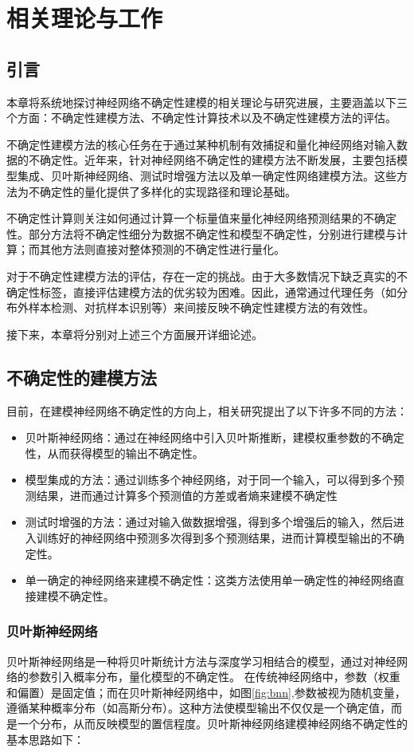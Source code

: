 \chapter{相关理论与工作}
\section{引言}

本章将系统地探讨神经网络不确定性建模的相关理论与研究进展，主要涵盖以下三个方面：不确定性建模方法、不确定性计算技术以及不确定性建模方法的评估。

不确定性建模方法的核心任务在于通过某种机制有效捕捉和量化神经网络对输入数据的不确定性。近年来，针对神经网络不确定性的建模方法不断发展，主要包括模型集成、贝叶斯神经网络、测试时增强方法以及单一确定性网络建模方法。这些方法为不确定性的量化提供了多样化的实现路径和理论基础。

不确定性计算则关注如何通过计算一个标量值来量化神经网络预测结果的不确定性。部分方法将不确定性细分为数据不确定性和模型不确定性，分别进行建模与计算；而其他方法则直接对整体预测的不确定性进行量化。

对于不确定性建模方法的评估，存在一定的挑战。由于大多数情况下缺乏真实的不确定性标签，直接评估建模方法的优劣较为困难。因此，通常通过代理任务（如分布外样本检测、对抗样本识别等）来间接反映不确定性建模方法的有效性。

接下来，本章将分别对上述三个方面展开详细论述。


\section{不确定性的建模方法}
目前，在建模神经网络不确定性的方向上，相关研究提出了以下许多不同的方法：
\begin{itemize}
    \item 贝叶斯神经网络：通过在神经网络中引入贝叶斯推断，建模权重参数的不确定性，从而获得模型的输出不确定性。
    \item 模型集成的方法：通过训练多个神经网络，对于同一个输入，可以得到多个预测结果，进而通过计算多个预测值的方差或者熵来建模不确定性
    \item 测试时增强的方法：通过对输入做数据增强，得到多个增强后的输入，然后进入训练好的神经网络中预测多次得到多个预测结果，进而计算模型输出的不确定性。
    \item 单一确定的神经网络来建模不确定性：这类方法使用单一确定性的神经网络直接建模不确定性。
\end{itemize}

\subsection{贝叶斯神经网络}
贝叶斯神经网络\cite{goan2020bayesian}\cite{mackay1996bayesian}\cite{jospin2022hands}是一种将贝叶斯统计方法与深度学习相结合的模型，通过对神经网络的参数引入概率分布，量化模型的不确定性。 在传统神经网络中，参数（权重和偏置）是固定值；而在贝叶斯神经网络中，如图\ref{fig:bnn},参数被视为随机变量，遵循某种概率分布（如高斯分布）。这种方法使模型输出不仅仅是一个确定值，而是一个分布，从而反映模型的置信程度。贝叶斯神经网络建模神经网络不确定性的基本思路如下：

